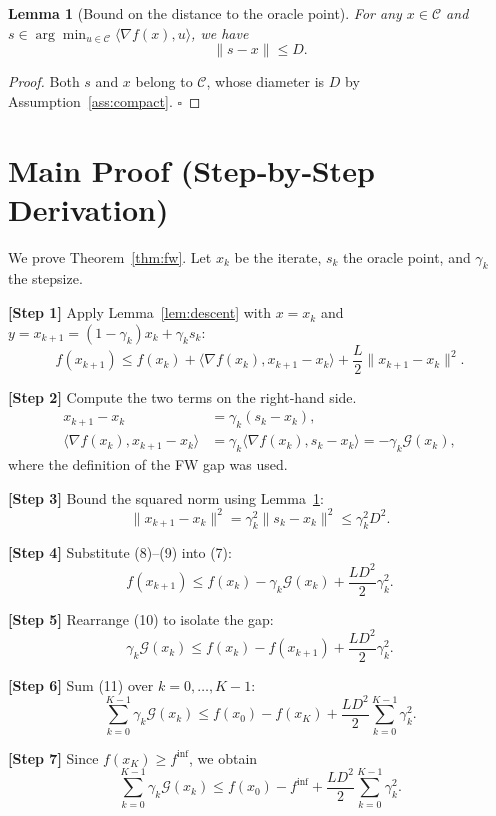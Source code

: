 \documentclass{article}
\newtheorem{lemma}{Lemma}
\newcommand{\grad}{\nabla}
\newcommand{\gap}{\mathcal{G}}
\newcommand{\dom}{\mathcal{C}}
\begin{document}
\begin{lemma}[Bound on the distance to the oracle point]
\label{lem:dist}
For any $x\in\dom$ and $s\in\arg\min_{u\in\dom}\langle\grad f(x),u\rangle$, we have
\[
\|s-x\|\le D.
\tag{6}
\]
\end{lemma}
\begin{proof}
Both $s$ and $x$ belong to $\dom$, whose diameter is $D$ by Assumption~\ref{ass:compact}. \hfill $\square$
\end{proof}

\section*{Main Proof (Step‑by‑Step Derivation)}
We prove Theorem~\ref{thm:fw}. Let $x_{k}$ be the iterate, $s_{k}$ the oracle point, and $\gamma_{k}$ the stepsize.

\noindent\textbf{[Step 1]} Apply Lemma~\ref{lem:descent} with $x=x_{k}$ and $y=x_{k+1}=(1-\gamma_{k})x_{k}+\gamma_{k}s_{k}$:
\[
f(x_{k+1})\le f(x_{k})+\langle\grad f(x_{k}),x_{k+1}-x_{k}\rangle+\frac{L}{2}\|x_{k+1}-x_{k}\|^{2}.
\tag{7}
\]

\noindent\textbf{[Step 2]} Compute the two terms on the right‑hand side.
\begin{align*}
x_{k+1}-x_{k}&=\gamma_{k}(s_{k}-x_{k}),\\[1mm]
\langle\grad f(x_{k}),x_{k+1}-x_{k}\rangle
&=\gamma_{k}\langle\grad f(x_{k}),s_{k}-x_{k}\rangle
=-\gamma_{k}\gap(x_{k}), \tag{8}
\end{align*}
where the definition of the FW gap was used.

\noindent\textbf{[Step 3]} Bound the squared norm using Lemma~\ref{lem:dist}:
\[
\|x_{k+1}-x_{k}\|^{2}
=\gamma_{k}^{2}\|s_{k}-x_{k}\|^{2}
\le \gamma_{k}^{2}D^{2}. \tag{9}
\]

\noindent\textbf{[Step 4]} Substitute (8)–(9) into (7):
\[
f(x_{k+1})\le f(x_{k})-\gamma_{k}\gap(x_{k})+\frac{L D^{2}}{2}\gamma_{k}^{2}.
\tag{10}
\]

\noindent\textbf{[Step 5]} Rearrange (10) to isolate the gap:
\[
\gamma_{k}\gap(x_{k})\le f(x_{k})-f(x_{k+1})+\frac{L D^{2}}{2}\gamma_{k}^{2}.
\tag{11}
\]

\noindent\textbf{[Step 6]} Sum (11) over $k=0,\dots,K-1$:
\[
\sum_{k=0}^{K-1}\gamma_{k}\gap(x_{k})
\le f(x_{0})-f(x_{K})+\frac{L D^{2}}{2}\sum_{k=0}^{K-1}\gamma_{k}^{2}.
\tag{12}
\]

\noindent\textbf{[Step 7]} Since $f(x_{K})\ge f^{\inf}$, we obtain
\[
\sum_{k=0}^{K-1}\gamma_{k}\gap(x_{k})
\le f(x_{0})-f^{\inf}+\frac{L D^{2}}{2}\sum_{k=0}^{K-1}\gamma_{k}^{2}.
\tag{13}
\]
\end{document}
